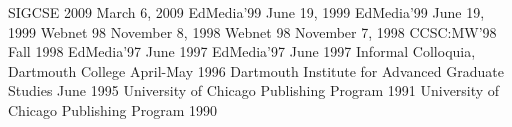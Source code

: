 \begin{cventries}

  {SIGCSE 2009}
  {March 6, 2009}
  {EdMedia'99}
  {June 19, 1999}
  {EdMedia'99}
  {June 19, 1999}
  {Webnet 98}
  {November 8, 1998}
  {Webnet 98}
  {November 7, 1998}
  {CCSC:MW'98}
  {Fall 1998}
  {EdMedia'97}
  {June 1997}
  {EdMedia'97}
  {June 1997}
  {Informal Colloquia, Dartmouth College}
  {April-May 1996}
  {Dartmouth Institute for Advanced Graduate Studies}
  {June 1995}
  {University of Chicago Publishing Program}
  {1991}
  {University of Chicago Publishing Program}
  {1990}

\end{cventries}
